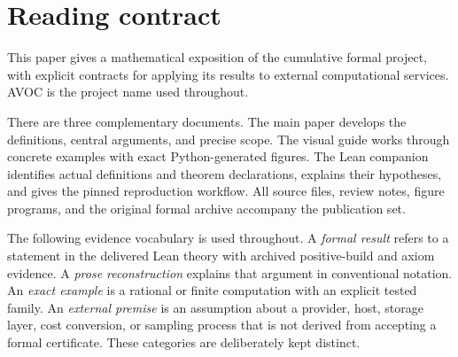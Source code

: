 \begin{abstract}
An artifact can be correct and still be a poor computational investment. A probability estimate can be useful and still be invalid for the stream on which it is applied. A recovery protocol can preserve a logical checkpoint and still depend on an unverified external execution contract. AVOC develops these distinctions within a finite formal architecture for artifact planning. Its cumulative theory combines task sufficiency, stochastic and Bayesian information transport, exact checking for declared artifact languages, finite-horizon planning, robust quote bounds, rational finite-sample calibration, and recoverable state transitions. The latest recorder block connects complete executions of a source-generative lifecycle machine to its actual terminal sample prefixes and proves an unconditional bound on uncertified policy issuance. We present central definitions and proof mechanisms, worked exact examples, and a theorem-to-source map. We also explain a completion-order obstruction: honest and complete logging can turn independent attempted outcomes into biased reported prefixes. The publication is based on the preserved v0.41.0 sources and their archived Lean verification. Fresh source-inventory and exact Python checks are reported separately from compilation, which was not repeated for this edition.
\end{abstract}

\section*{Reading contract}
This paper gives a mathematical exposition of the cumulative formal project, with explicit contracts for applying its results to external computational services. AVOC is the project name used throughout.

There are three complementary documents. The main paper develops the definitions, central arguments, and precise scope. The visual guide works through concrete examples with exact Python-generated figures. The Lean companion identifies actual definitions and theorem declarations, explains their hypotheses, and gives the pinned reproduction workflow. All source files, review notes, figure programs, and the original formal archive accompany the publication set.

The following evidence vocabulary is used throughout. A \emph{formal result} refers to a statement in the delivered Lean theory with archived positive-build and axiom evidence. A \emph{prose reconstruction} explains that argument in conventional notation. An \emph{exact example} is a rational or finite computation with an explicit tested family. An \emph{external premise} is an assumption about a provider, host, storage layer, cost conversion, or sampling process that is not derived from accepting a formal certificate. These categories are deliberately kept distinct.

